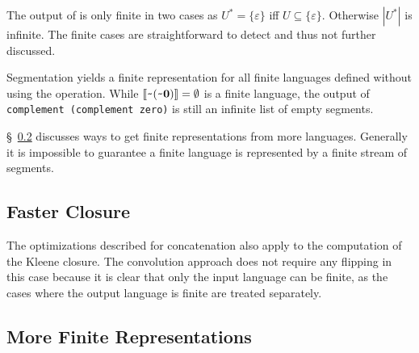 The output of  is only finite in two cases as $U^* = \{\varepsilon\}$ iff
$U\subseteq\{\varepsilon\}$. Otherwise $|U^*|$ is infinite.
The finite cases are straightforward to detect and thus not further discussed.



Segmentation yields a finite representation for all finite languages
defined without using the  operation. While
$\llbracket\texttt{\textasciitilde}{(\texttt{\textasciitilde}{\mathbf0})}\rrbracket = \emptyset$ is a finite 
language, the output of \lstinline{complement (complement zero)} is still an
infinite list of empty segments.

\S~\ref{sec:more-finite-repr}  discusses ways to get finite
representations from more languages. Generally it is
impossible to guarantee a finite language is represented by a
finite stream of segments.


\subsection{Faster Closure}
\label{sec:faster-closure}

The optimizations described for concatenation also apply to the
computation of the Kleene closure. The convolution approach does not
require any flipping in this case because it is clear that only the input language
can be finite, as the cases where the output language is finite are
treated separately.  

\subsection{More Finite Representations}
\label{sec:more-finite-repr}

